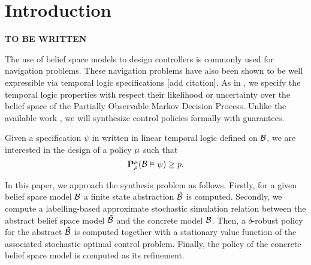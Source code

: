 \documentclass{ifacconf}
\newcommand{\red}[1]{{\color{red} #1}}
\begin{document}
\section{Introduction} \label{subsec:intro}
 \textbf{TO BE WRITTEN}

The use of belief space models  to design controllers is commonly used for navigation problems.   These navigation problems have also been shown to be well expressible via temporal logic specifications \red{[add citation]}. 
As in \citep{JonesDTL2013}, we specify the temporal logic properties with respect their likelihood or uncertainty over the belief space of the Partially Observable Markov Decision Process.
Unlike the available work \citep{Vasile2016,JonesDTL2013}, we will synthesize control policies formally with guarantees.



Given a specification $\psi$ in written in linear temporal logic defined on $\mathcal{B}$, we are interested 
in the design of a policy ${\mu}$ such that 
\[\mathbf{P}^{\mu}_\rho(\mathcal{B}\vDash \psi)\geq p.\]

In this paper, we approach the synthesis problem as follows. 
Firstly,  for a given belief space model $\mathcal{B}$ a finite state abstraction  $\hat {\mathcal{B}}$ is computed.
Secondly,  we compute a labelling-based approximate stochastic  simulation relation between the abstract belief space model  $\tilde{\mathcal{B}}$ and the concrete model $\mathcal{B}$.
 Then,  a $\delta$-robust policy for the abstract $\tilde{\mathcal{B}}$ is computed  together with a stationary value function of the associated stochastic optimal control problem.
  Finally, the policy of the concrete belief space model is computed  as its refinement.
\end{document}
